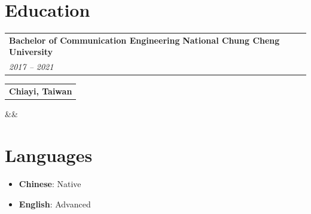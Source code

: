 \documentclass[11pt,a4paper,sans]{moderncv}
\makeatletter
\newcommand*{\customcventry}[7][.12em]{
\begin{tabular}{@{}l}
{\bfseries #4} \textbf{#3}\\
{\itshape #2}
\end{tabular}
\hfill
\begin{tabular}{l@{}}
{\bfseries #5}
\end{tabular}
\ifx&#7&%
\else{\\
\begin{minipage}{\maincolumnwidth}%
\small#7%
\end{minipage}}\fi%
\par\addvspace{#1}}
\makeatother
\begin{document}
\section{Education}

\customcventry{2017 -- 2021}{National Chung Cheng University}{Bachelor of Communication Engineering}{Chiayi, Taiwan}{}{}

\section{Languages}

\begin{itemize}[label=\textbullet, leftmargin=0.6cm]
  \item \textbf{Chinese}: Native
  \item \textbf{English}: Advanced
\end{itemize}
\end{document}

